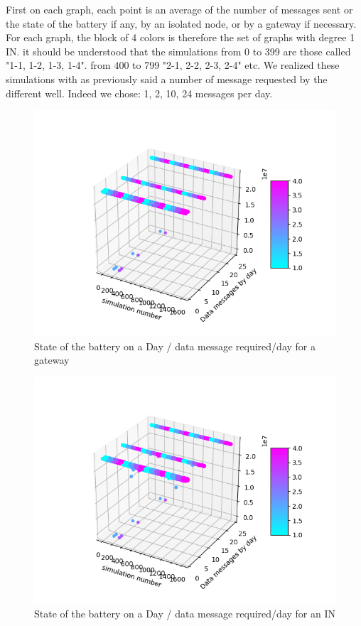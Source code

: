 \documentclass[conference]{IEEEtran}
\begin{document}
First on each graph, each point is an average of the number of messages sent or the state of the battery if any, by an isolated node, or by a gateway if necessary. For each graph, the block of 4 colors is therefore the set of graphs with degree 1 IN. it should be understood that the simulations from 0 to 399 are those called "1-1, 1-2, 1-3, 1-4". from 400 to 799 "2-1, 2-2, 2-3, 2-4" etc.
We realized these simulations with as previously said a number of message requested by the different well. Indeed we chose: 1, 2, 10, 24 messages per day.
\begin{figure}[htbp]
\centerline{\includegraphics[scale=0.5]{graphics_resultats/bat/Sim_MSG_SEND_data_bat_gw_degree_gw.png}}
\caption{State of the battery on a Day / data message required/day for a gateway}
\label{A}
\end{figure}

\begin{figure}[htbp]
\centerline{\includegraphics[scale=0.5]{graphics_resultats/bat/Sim_MSG_SEND_data_bat_in_degree_GW.png}}
\caption{State of the battery on a Day / data message required/day for an IN}
\label{A}
\end{figure}
\end{document}
